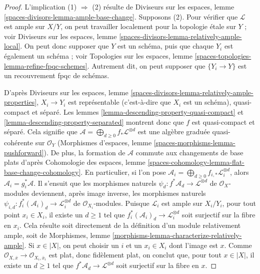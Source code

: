\begin{proof}
L'implication (1) $\Rightarrow$ (2) résulte de
Diviseurs sur les espaces, lemme \ref{spaces-divisors-lemma-ample-base-change}.
Supposons (2). Pour vérifier que $\mathcal{L}$ est ample sur $X/Y$, on peut
travailler localement pour la topologie \'etale sur $Y$ ; voir
Diviseurs sur les espaces, lemme \ref{spaces-divisors-lemma-relatively-ample-local}.
On peut donc supposer que $Y$ est un schéma, puis que
chaque $Y_i$ est également un schéma ; voir
Topologies sur les espaces, lemme \ref{spaces-topologies-lemma-refine-fpqc-schemes}.
Autrement dit, on peut supposer que
$\{Y_i \to Y\}$ est un recouvrement fpqc de schémas.

\medskip\noindent
D'après Diviseurs sur les espaces, lemme
\ref{spaces-divisors-lemma-relatively-ample-properties},
$X_i \to Y_i$ est représentable (c'est-à-dire que $X_i$ est un schéma),
quasi-compact et séparé. Les lemmes
\ref{lemma-descending-property-quasi-compact} et
\ref{lemma-descending-property-separated} montrent donc que $f$ est quasi-compact et séparé.
Cela signifie que
$\mathcal{A} = \bigoplus_{d \geq 0} f_*\mathcal{L}^{\otimes d}$
est une algèbre graduée quasi-cohérente sur $\mathcal{O}_Y$
(Morphismes d'espaces, lemme \ref{spaces-morphisms-lemma-pushforward}).
De plus, la formation de $\mathcal{A}$ commute aux
changements de base plats d'après
Cohomologie des espaces, lemme
\ref{spaces-cohomology-lemma-flat-base-change-cohomology}.
En particulier, si l'on pose
$\mathcal{A}_i = \bigoplus_{d \geq 0} f_{i, *}\mathcal{L}_i^{\otimes d}$,
alors $\mathcal{A}_i = g_i^*\mathcal{A}$.
Il s'ensuit que les morphismes naturels
$\psi_d : f^*\mathcal{A}_d \to \mathcal{L}^{\otimes d}$
de $\mathcal{O}_X$-modules
deviennent, après image inverse, les morphismes naturels
$\psi_{i, d} : f_i^*(\mathcal{A}_i)_d \to \mathcal{L}_i^{\otimes d}$
de $\mathcal{O}_{X_i}$-modules. Puisque $\mathcal{L}_i$ est ample sur $X_i/Y_i$,
pour tout point $x_i \in X_i$, il existe un $d \geq 1$
tel que $f_i^*(\mathcal{A}_i)_d \to \mathcal{L}_i^{\otimes d}$
soit surjectif sur la fibre en $x_i$. Cela résulte soit directement
de la définition d'un module relativement ample, soit de
Morphismes, lemme \ref{morphisms-lemma-characterize-relatively-ample}.
Si $x \in |X|$, on peut choisir un $i$ et un $x_i \in X_i$
dont l'image est $x$. Comme
$\mathcal{O}_{X, \overline{x}} \to \mathcal{O}_{X_i, \overline{x}_i}$
est plat, donc fidèlement plat, on conclut que, pour tout $x \in |X|$,
il existe un $d \geq 1$ tel que
$f^*\mathcal{A}_d \to \mathcal{L}^{\otimes d}$
soit surjectif sur la fibre en $x$.

\end{proof}
